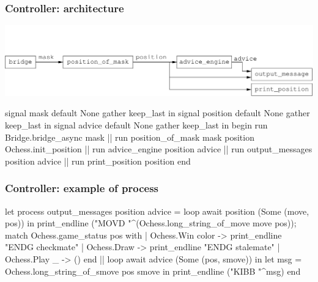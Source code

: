 \documentclass[t]{beamer}
\begin{document}




\begin{frame}[fragile]
\frametitle{Controller: architecture}

\includegraphics[scale=0.6]{figures/controller}

\pause

\begin{lstrml}
  signal mask default None gather keep_last in
  signal position default None gather keep_last in
  signal advice default None gather keep_last in
  begin
    run Bridge.bridge_async mask ||
    run position_of_mask mask position Ochess.init_position ||
    run advice_engine position advice ||
    run output_messages position advice ||
    run print_position position
  end
\end{lstrml}

\end{frame}


\begin{frame}[fragile]
\frametitle{Controller: example of process}

\begin{lstrml}
let process output_messages position advice =
  loop
    await position (Some (move, pos)) in
    print_endline ("MOVD "^(Ochess.long_string_of_move move pos));
    match Ochess.game_status pos with
    | Ochess.Win color -> print_endline "ENDG checkmate"
    | Ochess.Draw -> print_endline "ENDG stalemate"
    | Ochess.Play _ -> ()
  end
  ||
  loop
    await advice (Some (pos, smove)) in
    let msg = Ochess.long_string_of_smove pos smove in
    print_endline ("KIBB "^msg)
  end
\end{lstrml}

\end{frame}
\end{document}
